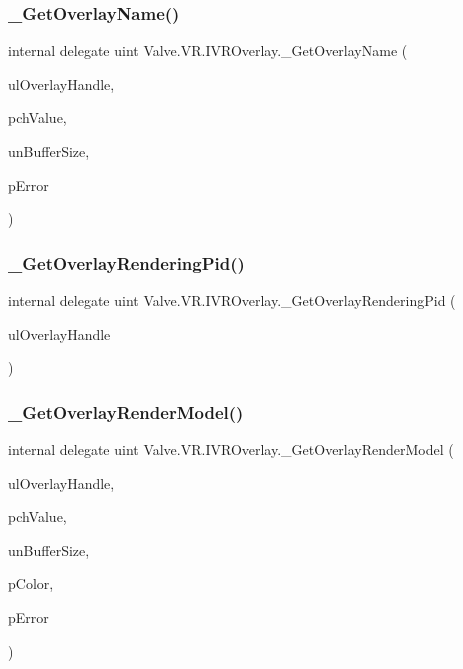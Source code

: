 \subsubsection{\texorpdfstring{\_GetOverlayName()}{\_GetOverlayName()}}
{\footnotesize\ttfamily internal delegate uint Valve.\+V\+R.\+I\+V\+R\+Overlay.\+\_\+\+Get\+Overlay\+Name (\begin{DoxyParamCaption}\item[{ulong}]{ul\+Overlay\+Handle,  }\item[{System.\+Text.\+String\+Builder}]{pch\+Value,  }\item[{uint}]{un\+Buffer\+Size,  }\item[{ref \mbox{\hyperlink{namespace_valve_1_1_v_r_aaee5c5144f42b7969d45b854f51b0c18}{E\+V\+R\+Overlay\+Error}}}]{p\+Error }\end{DoxyParamCaption})}

\mbox{\label{struct_valve_1_1_v_r_1_1_i_v_r_overlay_a3d5ff014664a9f79caa2c148682a6d30}} 
\subsubsection{\texorpdfstring{\_GetOverlayRenderingPid()}{\_GetOverlayRenderingPid()}}
{\footnotesize\ttfamily internal delegate uint Valve.\+V\+R.\+I\+V\+R\+Overlay.\+\_\+\+Get\+Overlay\+Rendering\+Pid (\begin{DoxyParamCaption}\item[{ulong}]{ul\+Overlay\+Handle }\end{DoxyParamCaption})}

\mbox{\label{struct_valve_1_1_v_r_1_1_i_v_r_overlay_a97891b66fe3f14691f4eb8f6642ad5ef}} 
\subsubsection{\texorpdfstring{\_GetOverlayRenderModel()}{\_GetOverlayRenderModel()}}
{\footnotesize\ttfamily internal delegate uint Valve.\+V\+R.\+I\+V\+R\+Overlay.\+\_\+\+Get\+Overlay\+Render\+Model (\begin{DoxyParamCaption}\item[{ulong}]{ul\+Overlay\+Handle,  }\item[{System.\+Text.\+String\+Builder}]{pch\+Value,  }\item[{uint}]{un\+Buffer\+Size,  }\item[{ref \mbox{\hyperlink{struct_valve_1_1_v_r_1_1_hmd_color__t}{Hmd\+Color\+\_\+t}}}]{p\+Color,  }\item[{ref \mbox{\hyperlink{namespace_valve_1_1_v_r_aaee5c5144f42b7969d45b854f51b0c18}{E\+V\+R\+Overlay\+Error}}}]{p\+Error }\end{DoxyParamCaption})}

